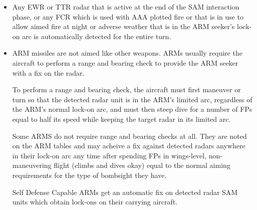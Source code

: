 \begin{itemize}

\item{} Any EWR or TTR radar that is active at the end of the SAM interaction phase, or any FCR which is used with AAA plotted fire or that is in use to allow aimed fire at night or adverse weather that is in the ARM seeker's lock-on arc is automatically detected for the entire turn. 


\item{} ARM missiles are not aimed like other weapons. ARMs usually require the aircraft to perform a range and bearing check to provide the ARM seeker with a fix on the radar.

To perform a range and bearing check, the aircraft must first maneuver or turn so that the detected radar unit is in the ARM’s limited arc, regardless of the ARM's normal lock-on arc, and must then steep dive for a number of FPs equal to half its speed while keeping the target radar in its limited arc.

Some ARMS do not require range and bearing checks at all. They are noted on the ARM tables and may acheive a fix against detected radars anywhere in their lock-on arc any time after spending FPs in wings-level, non-maneuvering flight (climbs and dives okay) equal to the normal aiming requirements for the type of bombsight they have.



Self Defense Capable ARMs get an automatic fix on detected radar SAM units which obtain lock-ons on their carrying aircraft.


\end{itemize}

